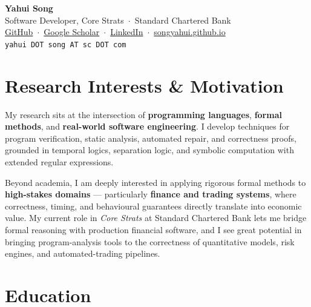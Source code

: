 \documentclass[11pt, a4paper]{article}
\begin{document}
\begin{center}
  {\LARGE\bfseries\color{heading} Yahui Song}\\[6pt]
  {\color{clrmuted} Software Developer, Core Strats\ $\cdot$\ Standard Chartered Bank}\\[4pt]
  \href{https://github.com/songyahui}{GitHub}\ $\cdot$\
  \href{https://scholar.google.com/citations?user=_OglTEAAAAAJ&hl}{Google Scholar}\ $\cdot$\
  \href{https://www.linkedin.com/in/yahui-song-667047179/}{LinkedIn}\ $\cdot$\
  \href{https://songyahui.github.io}{songyahui.github.io}\\
  {\small\texttt{yahui DOT song AT sc DOT com}}
\end{center}

\vspace{6pt}

\section{Research Interests \& Motivation}

My research sits at the intersection of \textbf{programming languages}, \textbf{formal methods},
and \textbf{real-world software engineering}. I develop techniques for program verification,
static analysis, automated repair, and correctness proofs, grounded in temporal logics,
separation logic, and symbolic computation with extended regular expressions.

Beyond academia, I am deeply interested in applying rigorous formal methods to
\textbf{high-stakes domains} --- particularly \textbf{finance and trading systems}, where
correctness, timing, and behavioural guarantees directly translate into economic value.
My current role in \emph{Core Strats} at Standard Chartered Bank lets me bridge formal reasoning
with production financial software, and I see great potential in bringing program-analysis tools
to the correctness of quantitative models, risk engines, and automated-trading pipelines.

\section{Education}
\end{document}

